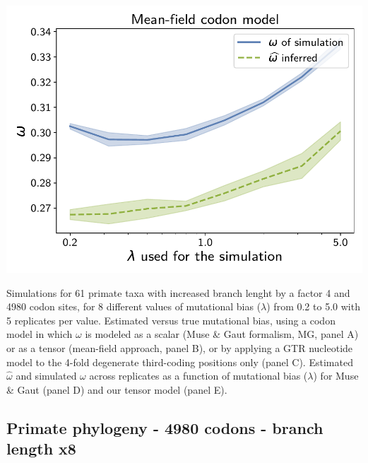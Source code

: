 \documentclass{article}
\begin{document}
\begin{center}
\begin{minipage}{0.325\linewidth}
        \includegraphics[width=\linewidth, page=1]{inference_supp_mat/PrimatesExons10Mu4.0_omega_MF.pdf}
    \end{minipage}
\end{center}
Simulations for 61 primate taxa with increased branch lenght by a factor 4 and 4980 codon sites, for 8 different values of mutational bias ($\lambda$) from 0.2 to 5.0 with 5 replicates per value.
Estimated versus true mutational bias, using a codon model in which $\omega$ is modeled as a scalar (Muse \& Gaut formalism, MG, panel A) or as a tensor (mean-field approach, panel B), or by applying a GTR nucleotide model to the 4-fold degenerate third-coding positions only (panel C).
Estimated $\hat{\omega}$ and simulated $\omega$ across replicates as a function of mutational bias ($\lambda$) for Muse \& Gaut (panel D) and our tensor model (panel E).

\subsection{Primate phylogeny - 4980 codons - branch length x8}
\end{document}
